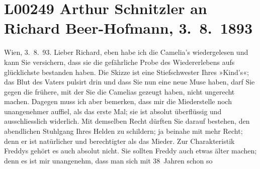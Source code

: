 

\section[Arthur Schnitzler an Richard Beer-Hofmann, 3. 8. 1893]{L00249 Arthur Schnitzler an Richard Beer-Hofmann, 3. 8. 1893}
\nopagebreak{}
\rehead{ }\normalsize\beginnumbering{}
\toendnotes[C]{\smallbreak\pagebreak[2]}
\toendnotes[C]{\smallbreak}
\pstart
           \raggedleft{}{\pb}Wien, 3. 8. 93.\pend
           \vspace{0.5em}
\pstart
           Lieber Richard, eben habe ich die Camelia’s wiedergelesen und kann Sie versichern, dass sie die gefährliche
               Probe des Wiedererlebens aufs glücklichste bestanden haben. Die Skizze ist eine
               Stiefschwester Ihres »Kind’s«; das Blut des
               Vaters pulsirt drin und dass Sie nun eine neue Muse haben, darf Sie gegen die
               frühere, mit der Sie die Camelias gezeugt haben,
               nicht ungerecht machen. Dagegen muss ich aber bemerken, dass mir die Miederstelle
               noch unangenehmer auffiel, als das erste Mal; sie ist absolut überflüssig und
               ausschliesslich widerlich. Mit demselben Recht dürften Sie darauf bestehen, den
               abendlichen Stuhlgang Ihres Helden zu schildern; ja beinahe mit mehr Recht; denn er
               ist natürlicher und berechtigter als das Mieder. Zur Charakteristik Freddys gehört es auch absolut
               nicht. Sie sollten Freddy auch
               etwas älter machen; denn es ist mir unangenehm, dass man sich mit 38 Jahren schon so
